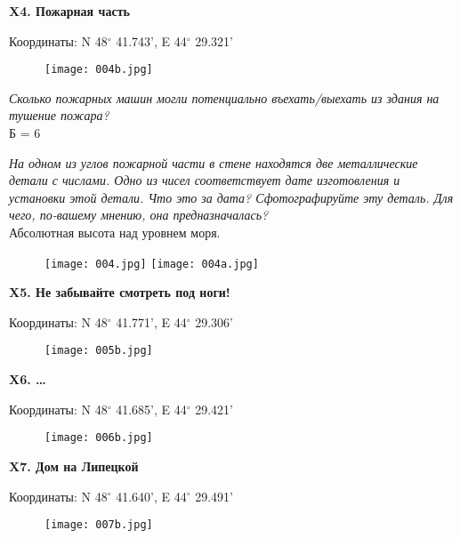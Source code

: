 \documentclass[pscyr]{hedwork}
\begin{document}
  \textbf{X4. Пожарная часть}

  Координаты: N 48\( ^\circ \) 41.743', E 44\( ^\circ \) 29.321'

  \begin{figure}[h!]
    \center
    \texttt{[image: 004b.jpg]}
  \end{figure}

  \emph{Сколько пожарных машин могли потенциально въехать/выехать из здания на
  тушение пожара?} \\
  Б = 6

  \emph{На одном из углов пожарной части в стене находятся две металлические
  детали с числами. Одно из чисел соответствует дате изготовления и установки
  этой детали. Что это за дата? Сфотографируйте эту деталь. Для чего, по-вашему
  мнению, она предназначалась?} \\  
  Абсолютная высота над уровнем моря.

  \begin{figure}[h!]
    \center
    \texttt{[image: 004.jpg]} \hfill
    \texttt{[image: 004a.jpg]}
  \end{figure}

  \newpage

  \textbf{X5. Не забывайте смотреть под ноги!}

  Координаты: N 48\( ^\circ \) 41.771', E 44\( ^\circ \) 29.306'

  \begin{figure}[h!]
    \center
    \texttt{[image: 005b.jpg]}
  \end{figure}

  \newpage

  \textbf{X6. \ldots}

  Координаты: N 48\( ^\circ \) 41.685', E 44\( ^\circ \) 29.421'

  \begin{figure}[h!]
    \center
    \texttt{[image: 006b.jpg]}
  \end{figure}

  \newpage

  \textbf{X7. Дом на Липецкой}

  Координаты: N 48\( ^\circ \) 41.640', E 44\( ^\circ \) 29.491'

  \begin{figure}[h!]
    \center
    \texttt{[image: 007b.jpg]}
  \end{figure}
\end{document}
